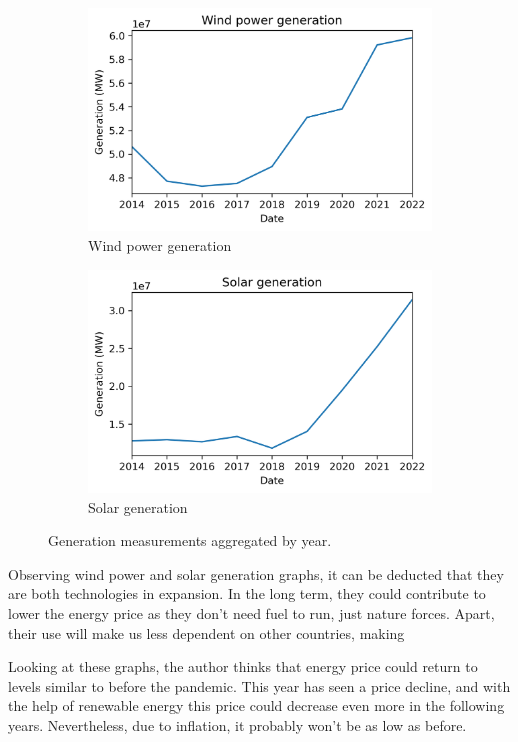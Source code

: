 \begin{figure}[H]\ContinuedFloat
    \begin{subfigure}{.45\textwidth}
        \centering
        \includegraphics[width=1\linewidth]{images/analysis/wind-gen-yearly}
        \caption{Wind power generation}
    \end{subfigure}
    \begin{subfigure}{.45\textwidth}
        \centering
        \includegraphics[width=1\linewidth]{images/analysis/solar-gen-yearly}
        \caption{Solar generation}
    \end{subfigure}

    \caption{Generation measurements aggregated by year.}
    \label{fig:gen-yearly}
\end{figure}

Observing wind power and solar generation graphs, it can be deducted that they are both technologies in expansion. In the long term, they could contribute to lower the energy price as they don't need fuel to run, just nature forces. Apart, their use will make us less dependent on other countries, making

Looking at these graphs, the author thinks that energy price could return to levels similar to before the pandemic. This year has seen a price decline, and with the help of renewable energy this price could decrease even more in the following years. Nevertheless, due to inflation, it probably won't be as low as before.